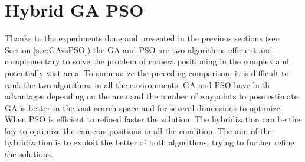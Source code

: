  







\section{Hybrid GA PSO }\label{sec:hybridGAPSO}
 

Thanks to the experiments done and presented in the previous sections (see  Section \ref{sec:GAvsPSO}) the GA and PSO are two algorithms efficient and complementary to solve the problem of camera positioning in the complex and potentially vast area.
  To summarize the preceding comparison, it is difficult to rank the two algorithms in all the environments. GA and PSO have both advantages depending on the area and the number of waypoints to pose estimate. GA is better in the vast search space and for several dimensions to optimize. When PSO is efficient to refined faster the solution.
 The hybridization can be the key to optimize the cameras positions in all the condition. The aim of the hybridization is to exploit the better of both algorithms, trying to further refine the solutions. 

